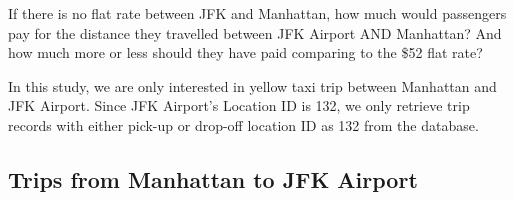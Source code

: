 \documentclass[12pt,twoside]{reedthesis}
\newenvironment{Shaded}{\begin{snugshade}}{\end{snugshade}}
\newcommand{\KeywordTok}[1]{\textcolor[rgb]{0.13,0.29,0.53}{\textbf{#1}}}
\newcommand{\DecValTok}[1]{\textcolor[rgb]{0.00,0.00,0.81}{#1}}
\newcommand{\StringTok}[1]{\textcolor[rgb]{0.31,0.60,0.02}{#1}}
\newcommand{\CommentTok}[1]{\textcolor[rgb]{0.56,0.35,0.01}{\textit{#1}}}
\newcommand{\OperatorTok}[1]{\textcolor[rgb]{0.81,0.36,0.00}{\textbf{#1}}}
\newcommand{\NormalTok}[1]{#1}
\theoremstyle{definition}
\theoremstyle{definition}
\theoremstyle{definition}
\theoremstyle{remark}
\begin{document}
If there is no flat rate between JFK and Manhattan, how much would
passengers pay for the distance they travelled between JFK Airport AND
Manhattan? And how much more or less should they have paid comparing to
the \$52 flat rate?

In this study, we are only interested in yellow taxi trip between
Manhattan and JFK Airport. Since JFK Airport's Location ID is 132, we
only retrieve trip records with either pick-up or drop-off location ID
as 132 from the database.
\begin{Shaded}
\end{Shaded}
\subsection{Trips from Manhattan to JFK
Airport}\label{trips-from-manhattan-to-jfk-airport}
\end{document}
